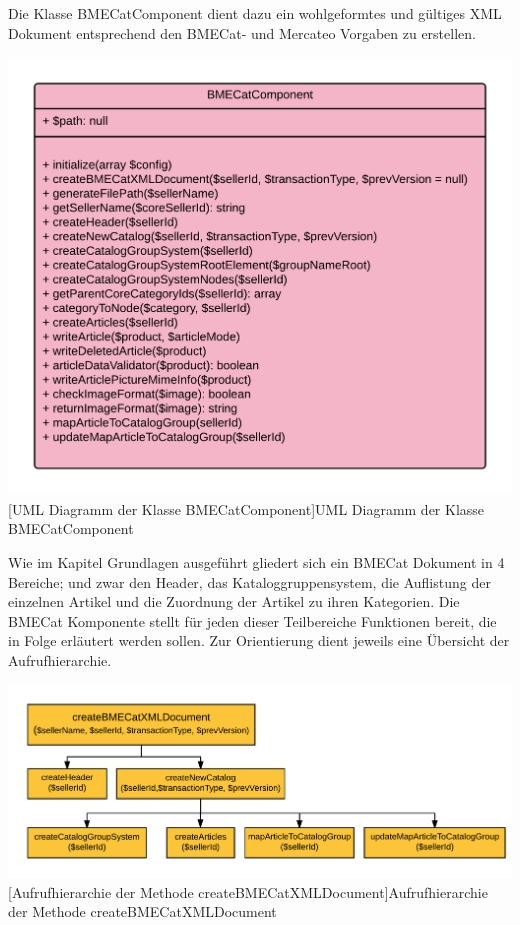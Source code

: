 	Die Klasse BMECatComponent dient dazu ein wohlgeformtes und gültiges XML Dokument entsprechend den BMECat- und Mercateo Vorgaben zu erstellen. \\
	\begin{minipage}{\linewidth}
		\vspace{1em}
		\centering
		\includegraphics[width=0.8 \linewidth]{img/BMECatComponentUML}
		[UML Diagramm der Klasse BMECatComponent]{UML Diagramm der Klasse BMECatComponent}
		\vspace{1em}
	\end{minipage}
	Wie im Kapitel Grundlagen ausgeführt gliedert sich ein BMECat Dokument in 4 Bereiche; und zwar den Header, das Kataloggruppensystem, die Auflistung der einzelnen Artikel und die Zuordnung der Artikel zu ihren Kategorien. Die BMECat Komponente stellt für jeden dieser Teilbereiche Funktionen bereit, die in Folge erläutert werden sollen.
	Zur Orientierung dient jeweils eine Übersicht der Aufrufhierarchie.\\
	
	\begin{minipage}{\linewidth}
		\vspace{1em}
		\centering
		\includegraphics[width=0.8 \linewidth]{img/createBMECatHierarchie}
		[Aufrufhierarchie der Methode createBMECatXMLDocument]{Aufrufhierarchie der Methode createBMECatXMLDocument}
		\vspace{1em}
	\end{minipage}
	
